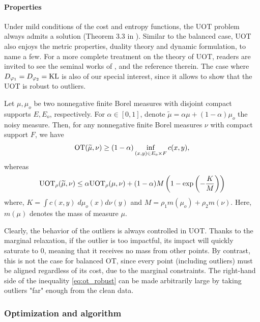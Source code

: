 \paragraph{Properties} Under mild conditions of the cost and entropy functions,
the UOT problem always admits a solution (Theorem 3.3 in \citep{Liero18}).
Similar to the balanced case, UOT also enjoys the metric properties, duality theory and
dynamic formulation, to name a few. For a more complete treatment on the theory of UOT,
readers are invited to see the seminal works of \citep{Liero18,Chizat18b}, and the reference therein.
The case where $D_{\varphi_1} = D_{\varphi_2} = \text{KL}$ is also of our special interest,
since it allows to show that the UOT is robust to outliers.
\begin{proposition}
  Let $\mu, \mu_o$ be two nonnegative finite Borel measures with disjoint compact supports $E, E_o$,
  respectively. For $\alpha \in [0, 1]$, denote $\widetilde{\mu} = \alpha \mu + (1 - \alpha) \mu_o$
  the noisy measure. Then, for any nonnegative finite Borel measures $\nu$
  with compact support $F$, we have
  \begin{align}
    \label{eq:ot_robust}
    \text{OT}(\widetilde{\mu}, \nu) \geq
    (1 - \alpha) \inf_{(x, y) \in E_o \times F} c(x, y),
  \end{align}
  whereas
  \begin{align}
    \text{UOT}_{\rho}(\widetilde{\mu}, \nu) \leq \alpha \text{UOT}_{\rho}(\mu, \nu) +
    (1 - \alpha) M
    \left( 1 - \exp \left( -\frac{K}{M} \right) \right)
  \end{align}
  where, $K = \int c(x, y) \; d\mu_o(x) d\nu(y)$ and $M = \rho_1 m(\mu_o) + \rho_2 m(\nu)$.
  Here, $m(\mu)$ denotes the mass of measure $\mu$.
\end{proposition}
Clearly, the behavior of the outliers is always controlled in UOT.
Thanks to the marginal relaxation, if the outlier is too impactful,
its impact will quickly saturate to $0$, meaning that it receives no mass from other points.
By contrast, this is not the case for balanced OT, since every point (including outliers)
must be aligned regardless of its cost, due to the marginal constraints. The right-hand side of
the inequality \ref{eq:ot_robust} can be made arbitrarily large by taking outliers "far" enough
from the clean data.

\subsubsection{Optimization and algorithm} \label{sub:uot_optim}

